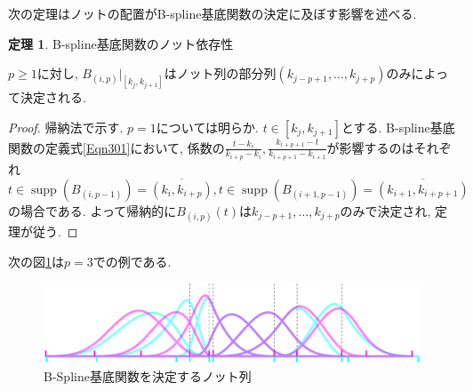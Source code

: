 \documentclass{jsarticle}
\newcommand\Cl[1]{\overline{#1}}
\newcommand\pare[1]{(#1)}
\DeclareMathOperator{\supp}{supp}
\theoremstyle{definition}%
\newtheorem{thm}{定理}
\begin{document}
次の定理はノットの配置がB-spline基底関数の決定に及ぼす影響を述べる.
\begin{screen}
	\begin{thm}
		\label{Thm302}
		B-spline基底関数のノット依存性

		$p\ge 1$に対し, $B_{(i,p)}|_{[k_j,k_{j+1}]}$はノット列の部分列$ \pare{k_{j-p+1}, \dots ,k_{j+p}} $のみによって決定される.
	\end{thm}
\end{screen}
\begin{proof}
    帰納法で示す.
    $p=1$については明らか.
    $t\in [k_{j},k_{j+1}]$とする.
    B-spline基底関数の定義式\eqref{Eqn301}において, 係数の$\frac{t-k_{i}}{k_{i+p}-k_{i}},\frac{k_{i+p+1}-t}{k_{i+p+1}-k_{i+1}}$が影響するのはそれぞれ$t\in \supp(B_{(i,p-1)})=\Cl{(k_{i},k_{i+p})}, t\in \supp(B_{(i+1,p-1)})=\Cl{(k_{i+1},k_{i+p+1})}$の場合である.
    よって帰納的に$B_{(i,p)}(t)$は$k_{j-p+1},\dots,k_{j+p}$のみで決定され, 定理が従う.
\end{proof}
次の図\ref{Fig303}は$p=3$での例である.
\addtocounter{footnote}{-1}
\begin{figure}[H]
	\centering
    \includegraphics[page=1,clip,width=150mm]{figA.pdf}
	\caption{B-Spline基底関数を決定するノット列\protect\footnotemark}
	\label{Fig303}
\end{figure}
\end{document}
